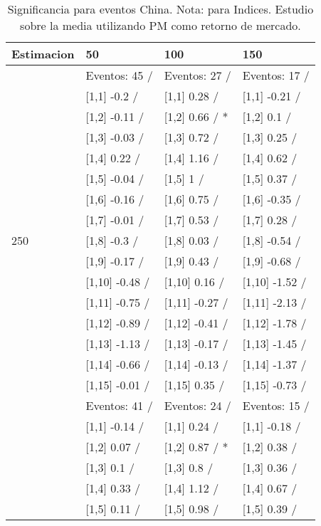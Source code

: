 \begin{table}

\caption{Significancia para eventos China. Nota: para Indices. Estudio sobre la media utilizando PM como retorno de mercado.}
\centering
\begin{tabular}[t]{llll}
\toprule
Estimacion & 50 & 100 & 150\\
\midrule
 & Eventos:  45 / & Eventos:  27 / & Eventos:  17 /\\
 & {}[1,1] -0.2  / & {}[1,1] 0.28  / & {}[1,1] -0.21  /\\
 & {}[1,2] -0.11  / & {}[1,2] 0.66  / * & {}[1,2] 0.1  /\\
 & {}[1,3] -0.03  / & {}[1,3] 0.72  / & {}[1,3] 0.25  /\\
 & {}[1,4] 0.22  / & {}[1,4] 1.16  / & {}[1,4] 0.62  /\\
\addlinespace
 & {}[1,5] -0.04  / & {}[1,5] 1  / & {}[1,5] 0.37  /\\
 & {}[1,6] -0.16  / & {}[1,6] 0.75  / & {}[1,6] -0.35  /\\
 & {}[1,7] -0.01  / & {}[1,7] 0.53  / & {}[1,7] 0.28  /\\
250 & {}[1,8] -0.3  / & {}[1,8] 0.03  / & {}[1,8] -0.54  /\\
 & {}[1,9] -0.17  / & {}[1,9] 0.43  / & {}[1,9] -0.68  /\\
\addlinespace
 & {}[1,10] -0.48  / & {}[1,10] 0.16  / & {}[1,10] -1.52  /\\
 & {}[1,11] -0.75  / & {}[1,11] -0.27  / & {}[1,11] -2.13  /\\
 & {}[1,12] -0.89  / & {}[1,12] -0.41  / & {}[1,12] -1.78  /\\
 & {}[1,13] -1.13  / & {}[1,13] -0.17  / & {}[1,13] -1.45  /\\
 & {}[1,14] -0.66  / & {}[1,14] -0.13  / & {}[1,14] -1.37  /\\
\addlinespace
 & {}[1,15] -0.01  / & {}[1,15] 0.35  / & {}[1,15] -0.73  /\\
 & Eventos:  41 / & Eventos:  24 / & Eventos:  15 /\\
 & {}[1,1] -0.14  / & {}[1,1] 0.24  / & {}[1,1] -0.18  /\\
 & {}[1,2] 0.07  / & {}[1,2] 0.87  / * & {}[1,2] 0.38  /\\
 & {}[1,3] 0.1  / & {}[1,3] 0.8  / & {}[1,3] 0.36  /\\
\addlinespace
 & {}[1,4] 0.33  / & {}[1,4] 1.12  / & {}[1,4] 0.67  /\\
 & {}[1,5] 0.11  / & {}[1,5] 0.98  / & {}[1,5] 0.39  /\\

\end{tabular}
\end{table}
